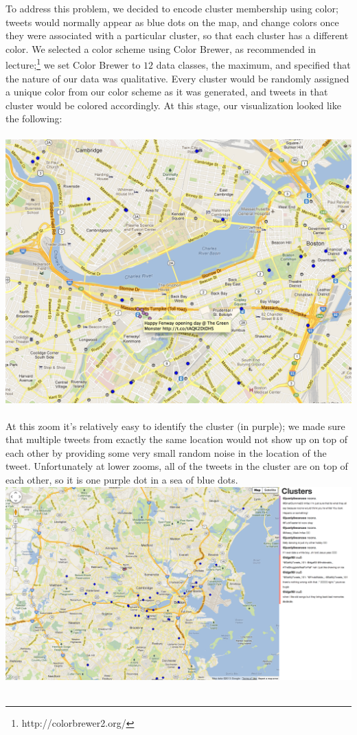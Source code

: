 \documentclass[pdftex,12pt,a4paper]{article}
\begin{document}
To address this problem, we decided to encode cluster membership using color; tweets would normally appear as blue dots on the map, and change colors once they were associated with a particular cluster, so that each cluster has a different color. We selected a color scheme using Color Brewer, as recommended in lecture;\footnote{http://colorbrewer2.org/} we set Color Brewer to $12$ data classes, the maximum, and specified that the nature of our data was qualitative. Every cluster would be randomly assigned a unique color from our color scheme as it was generated, and tweets in that cluster would be colored accordingly. At this stage, our visualization looked like the following: \\ \\
\includegraphics[width=5.5in]{fail1.png} \\ \\
At this zoom it's relatively easy to identify the cluster (in purple); we made sure that multiple tweets from exactly the same location would not show up on top of each other by providing some very small random noise in the location of the tweet. Unfortunately at lower zooms, all of the tweets in the cluster are on top of each other, so it is one purple dot in a sea of blue dots.
\includegraphics[width=5.5in]{fail2.png} \\ \\
\end{document}
